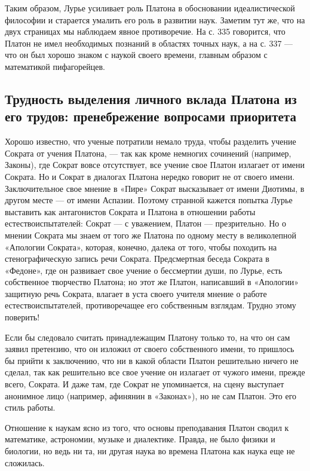 Таким образом, Лурье усиливает роль Платона в обосновании
идеалистической философии и старается умалить его роль в развитии
наук. Заметим тут же, что на двух страницах мы наблюдаем явное
противоречие. На с. 335 говорится, что Платон не имел необходимых
познаний в областях точных наук, а на с. 337 --- что он был хорошо
знаком с наукой своего времени, главным образом с математикой
пифагорейцев.

\subsection{Трудность выделения личного вклада Платона из его трудов:
пренебрежение вопросами приоритета}

Хорошо известно, что ученые потратили немало труда, чтобы
разделить учение Сократа от учения Платона, --- так как кроме немногих
сочинений (например, Законы), где Сократ вовсе отсутствует, все учение
свое Платон излагает от имени Сократа. Но и Сократ в диалогах Платона
нередко говорит не от своего имени. Заключительное свое мнение в
«Пире» Сократ высказывает от имени Диотимы, в другом месте --- от
имени Аспазии. Поэтому странной кажется попытка Лурье выставить как
антагонистов Сократа и Платона в отношении работы естествоиспытателей:
Сократ --- с уважением, Платон --- презрительно. Но о мнении Сократа
мы знаем от того же Платона по одному месту в великолепной «Апологии
Сократа», которая, конечно, далека от того, чтобы походить на
стенографическую запись речи Сократа. Предсмертная беседа Сократа в
«Федоне», где он развивает свое учение о бессмертии души, по Лурье,
есть собственное творчество Платона; но этот же Платон, написавший в
«Апологии» защитную речь Сократа, влагает в уста своего учителя мнение
о работе естествоиспытателей, противоречащее его собственным взглядам.
Трудно этому поверить!

Если бы следовало считать принадлежащим Платону только то, на что он
сам заявил претензию, что он изложил от своего собственного имени, то
пришлось бы прийти к заключению, что ни в какой области Платон
решительно ничего не сделал, так как решительно все свое учение он
излагает от чужого имени, прежде всего, Сократа. И даже там, где
Сократ не упоминается, на сцену выступает анонимное лицо (например,
афинянин в «Законах»), но не сам Платон. Это его стиль работы.

Отношение к наукам ясно из того, что основы преподавания Платон сводил
к математике, астрономии, музыке и диалектике. Правда, не было физики
и биологии, но ведь ни та, ни другая наука во времена Платона как
наука еще не сложилась.


